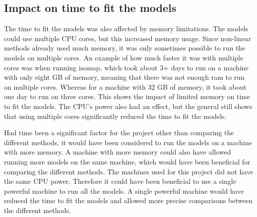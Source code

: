 \subsection{Impact on time to fit the models}\label{subsec:impact_on_time_to_fit_the_models}
The time to fit the models was also affected by memory limitations. The models could use multiple CPU cores, but this increased memory usage. Since non-linear methods already used much memory, it was only sometimes possible to run the models on multiple cores. An example of how much faster it was with multiple cores was when running \gls{isomap}, which took about 3+ days to run on a machine with only eight GB of memory, meaning that there was not enough ram to run on multiple cores. Whereas for a machine with 32 GB of memory, it took about one day to run on three cores. This shows the impact of limited memory on time to fit the models. The CPU's power also had an effect, but the general still shows that using multiple cores significantly reduced the time to fit the models.

Had time been a significant factor for the project other than comparing the different methods, it would have been considered to run the models on a machine with more memory. A machine with more memory could also have allowed running more models on the same machine, which would have been beneficial for comparing the different methods. The machines used for this project did not have the same CPU power. Therefore it could have been beneficial to use a single powerful machine to run all the models. A single powerful machine would have reduced the time to fit the models and allowed more precise comparisons between the different methods.





